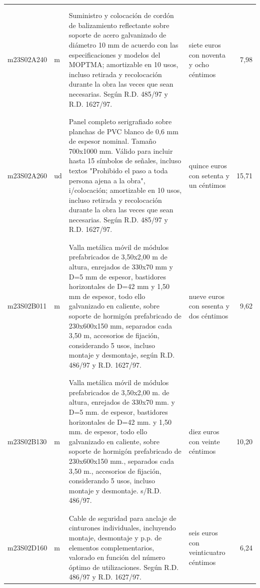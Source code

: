 \documentclass{book}%
\begin{document}
\begin{supertabular}{|l|l|p{5cm}|p{3cm}|r|}
&&&&\\%
&&&&\\%
m23S02A240&m&Suministro y colocación de cordón de balizamiento reflectante sobre soporte de acero galvanizado de diámetro 10 mm de acuerdo con las especificaciones y modelos del MOPTMA; amortizable en 10 usos, incluso retirada y recolocación durante la obra las veces que sean necesarias. Según R.D. 485/97 y R.D. 1627/97.&siete euros con noventa y ocho céntimos&7,98\\%
&&&&\\%
&&&&\\%
m23S02A260&ud&Panel completo serigrafiado sobre planchas de PVC blanco de 0,6 mm de espesor nominal. Tamaño 700x1000 mm. Válido para incluir hasta 15 símbolos de señales, incluso textos "Prohibido el paso a toda persona ajena a la obra", i/colocación; amortizable en 10 usos, incluso retirada y recolocación durante la obra las veces que sean necesarias. Según R.D. 485/97 y R.D. 1627/97.&quince euros con setenta y un céntimos&15,71\\%
&&&&\\%
&&&&\\%
m23S02B011&m&Valla metálica móvil de módulos prefabricados de 3,50x2,00 m de altura, enrejados de 330x70 mm y D=5 mm de espesor, bastidores horizontales de D=42 mm y 1,50 mm de espesor, todo ello galvanizado en caliente, sobre soporte de hormigón prefabricado de 230x600x150 mm, separados cada 3,50 m, accesorios de fijación, considerando 5 usos, incluso montaje y desmontaje, según R.D. 486/97 y R.D. 1627/97.&nueve euros con sesenta y dos céntimos&9,62\\%
&&&&\\%
&&&&\\%
m23S02B130&m&Valla metálica móvil de módulos prefabricados de 3,50x2,00 m. de altura, enrejados de 330x70 mm. y D=5 mm. de espesor, bastidores horizontales de D=42 mm. y 1,50 mm. de espesor, todo ello galvanizado en caliente, sobre soporte de hormigón prefabricado de 230x600x150 mm., separados cada 3,50 m., accesorios de fijación, considerando 5 usos, incluso montaje y desmontaje. s/R.D. 486/97.&diez euros con veinte céntimos&10,20\\%
&&&&\\%
&&&&\\%
m23S02D160&m&Cable de seguridad para anclaje de cinturones individuales, incluyendo montaje, desmontaje y p.p. de elementos complementarios, valorado en función del número óptimo de utilizaciones. Según R.D. 486/97 y R.D. 1627/97.&seis euros con veinticuatro céntimos&6,24\\%

\end{supertabular}
\end{document}
